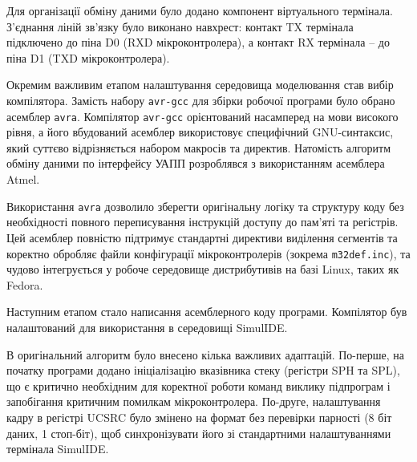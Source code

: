 \documentclass[14pt, a4paper]{extreport}
\begin{document}
	Для організації обміну даними було додано компонент віртуального термінала. З'єднання ліній зв'язку було виконано навхрест: контакт TX термінала підключено до піна D0 (RXD мікроконтролера), а контакт RX термінала -- до піна D1 (TXD мікроконтролера).
	
	Окремим важливим етапом налаштування середовища моделювання став вибір компілятора. Замість набору \texttt{avr-gcc} для збірки робочої програми було обрано асемблер \texttt{avra}. Компілятор \texttt{avr-gcc} орієнтований насамперед на мови високого рівня, а його вбудований асемблер використовує специфічний GNU-синтаксис, який суттєво відрізняється набором макросів та директив. Натомість алгоритм обміну даними по інтерфейсу УАПП розроблявся з використанням асемблера Atmel.
	
	Використання \texttt{avra} дозволило зберегти оригінальну логіку та структуру коду без необхідності повного переписування інструкцій доступу до пам'яті та регістрів. Цей асемблер повністю підтримує стандартні директиви виділення сегментів та коректно обробляє файли конфігурації мікроконтролерів (зокрема \texttt{m32def.inc}), та чудово інтегрується у робоче середовище дистрибутивів на базі Linux, таких як Fedora.
	
	
	Наступним етапом стало написання асемблерного коду програми. Компілятор був налаштований для використання в середовищі SimulIDE.
	
	
	В оригінальний алгоритм було внесено кілька важливих адаптацій. По-перше, на початку програми додано ініціалізацію вказівника стеку (регістри SPH та SPL), що є критично необхідним для коректної роботи команд виклику підпрограм і запобігання критичним помилкам мікроконтролера. По-друге, налаштування кадру в регістрі UCSRC було змінено на формат без перевірки парності (8 біт даних, 1 стоп-біт), щоб синхронізувати його зі стандартними налаштуваннями термінала SimulIDE.
	
\end{document}
